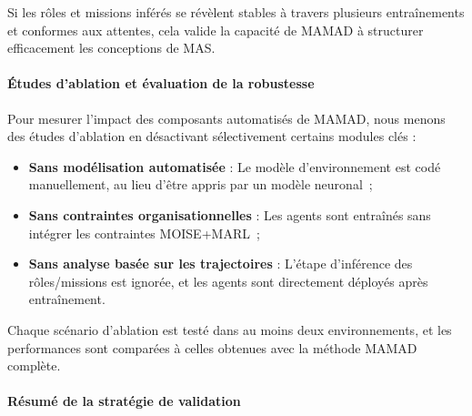 Si les rôles et missions inférés se révèlent stables à travers plusieurs entraînements et conformes aux attentes, cela valide la capacité de MAMAD à structurer efficacement les conceptions de MAS.

\paragraph{Études d'ablation et évaluation de la robustesse}

Pour mesurer l'impact des composants automatisés de MAMAD, nous menons des études d'ablation en désactivant sélectivement certains modules clés :

\begin{itemize}
    \item \textbf{Sans modélisation automatisée} : Le modèle d'environnement est codé manuellement, au lieu d'être appris par un modèle neuronal~;
    \item \textbf{Sans contraintes organisationnelles} : Les agents sont entraînés sans intégrer les contraintes MOISE+MARL~;
    \item \textbf{Sans analyse basée sur les trajectoires} : L'étape d'inférence des rôles/missions est ignorée, et les agents sont directement déployés après entraînement.
\end{itemize}

Chaque scénario d'ablation est testé dans au moins deux environnements, et les performances sont comparées à celles obtenues avec la méthode MAMAD complète.

\paragraph{Résumé de la stratégie de validation}

